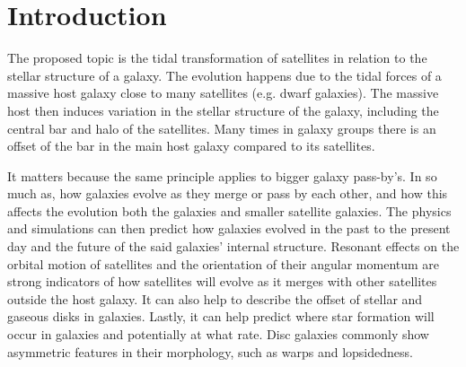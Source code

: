 \documentclass[linenumbers,trackchanges]{aastex7}
\begin{document}
\section{Introduction}
The proposed topic is the tidal transformation of satellites in relation to the stellar structure of a galaxy. The evolution happens due to the tidal forces of a massive host galaxy close to many satellites (e.g. dwarf galaxies). The massive host then induces variation in the stellar structure of the galaxy, including the central bar and halo of the satellites. Many times in galaxy groups there is an offset of the bar in the main host galaxy compared to its satellites.  

It matters because the same principle applies to bigger galaxy pass-by's. In so much as, how galaxies evolve as they merge or pass by each other, and how this affects the evolution both the galaxies and smaller satellite galaxies. The physics and simulations can then predict how galaxies evolved in the past to the present day and the future of the said galaxies' internal structure. Resonant effects on the orbital motion of satellites and the orientation of their angular momentum are strong indicators of how satellites will evolve as it merges with other satellites outside the host galaxy. It can also help to describe the offset of stellar and gaseous disks in galaxies. Lastly, it can help predict where star formation will occur in galaxies and potentially at what rate. Disc galaxies commonly show asymmetric features in their morphology, such as warps and lopsidedness. 
\end{document}
